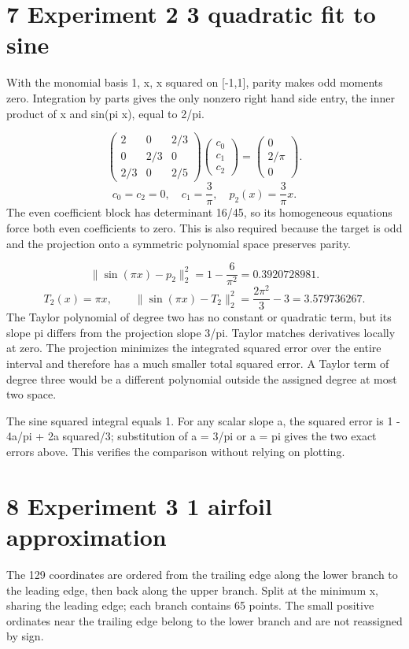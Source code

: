 \documentclass[a4paper,11pt]{article}
\begin{document}
\clearpage
\section*{7 Experiment 2 3 quadratic fit to sine}
With the monomial basis 1, x, x squared on [-1,1], parity makes odd moments zero. Integration by parts gives the only nonzero right hand side entry, the inner product of x and sin(pi x), equal to 2/pi.

\[\begin{pmatrix}2&0&2/3\\0&2/3&0\\2/3&0&2/5\end{pmatrix}\begin{pmatrix}c_0\\c_1\\c_2\end{pmatrix}=\begin{pmatrix}0\\2/\pi\\0\end{pmatrix}.\]
\[c_0=c_2=0,\quad c_1=\frac3\pi,\quad p_2(x)=\frac3\pi x.\]
The even coefficient block has determinant 16/45, so its homogeneous equations force both even coefficients to zero. This is also required because the target is odd and the projection onto a symmetric polynomial space preserves parity.

\[\|\sin(\pi x)-p_2\|_2^2=1-\frac6{\pi^2}=0.3920728981.\]
\[T_2(x)=\pi x,\qquad \|\sin(\pi x)-T_2\|_2^2=\frac{2\pi^2}{3}-3=3.579736267.\]
The Taylor polynomial of degree two has no constant or quadratic term, but its slope pi differs from the projection slope 3/pi. Taylor matches derivatives locally at zero. The projection minimizes the integrated squared error over the entire interval and therefore has a much smaller total squared error. A Taylor term of degree three would be a different polynomial outside the assigned degree at most two space.

The sine squared integral equals 1. For any scalar slope a, the squared error is 1 - 4a/pi + 2a squared/3; substitution of a = 3/pi or a = pi gives the two exact errors above. This verifies the comparison without relying on plotting.

\clearpage
\section*{8 Experiment 3 1 airfoil approximation}
The 129 coordinates are ordered from the trailing edge along the lower branch to the leading edge, then back along the upper branch. Split at the minimum x, sharing the leading edge; each branch contains 65 points. The small positive ordinates near the trailing edge belong to the lower branch and are not reassigned by sign.
\end{document}
